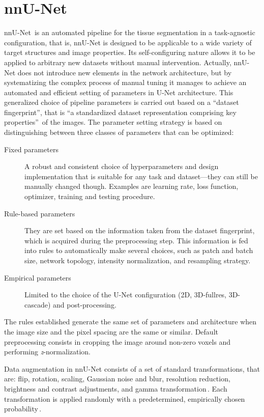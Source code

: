 \section{nnU-Net} \label{sec:nnUNet}
nnU-Net\,\cite{Isensee2021, nnUNet} is an automated pipeline for the tissue segmentation in a task-agnostic configuration, that is, nnU-Net is designed to be applicable to a wide variety of target structures and image properties. Its self-configuring nature allows it to be applied to arbitrary new datasets without manual intervention. Actually, nnU-Net does not introduce new elements in the network architecture, but by systematizing the complex process of manual tuning it manages to achieve an automated and efficient setting of parameters in U-Net architecture. This generalized choice of pipeline parameters is carried out based on a \enquote{dataset fingerprint}, that is \enquote{a standardized dataset representation comprising key properties}\,\cite{Isensee2021} of the images. The parameter setting strategy is based on distinguishing between three classes of parameters that can be optimized:
\begin{description}
    \item[Fixed parameters] A robust and consistent choice of hyperparameters and design implementation that is suitable for any task and dataset---they can still be manually changed though. Examples are learning rate, loss function, optimizer, training and testing procedure.
    \item[Rule-based parameters] They are set based on the information taken from the dataset fingerprint, which is acquired during the preprocessing step. This information is fed into rules to automatically make several choices, such as patch and batch size, network topology, intensity normalization, and resampling strategy.
    \item[Empirical parameters] Limited to the choice of the U-Net configuration (2D, 3D-fullres, 3D-cascade) and post-processing.
\end{description}
The rules established generate the same set of parameters and architecture when the image size and the pixel spacing are the same or similar. Default preprocessing consists in cropping the image around non-zero voxels and performing \textit{z}-normalization.

Data augmentation in nnU-Net consists of a set of standard transformations, that are: flip, rotation, scaling, Gaussian noise and blur, resolution reduction, brightness and contrast adjustments, and gamma transformation\,\cite{nnUNet}. Each transformation is applied randomly with a predetermined, empirically chosen probability\,\cite{Isensee2021}.

